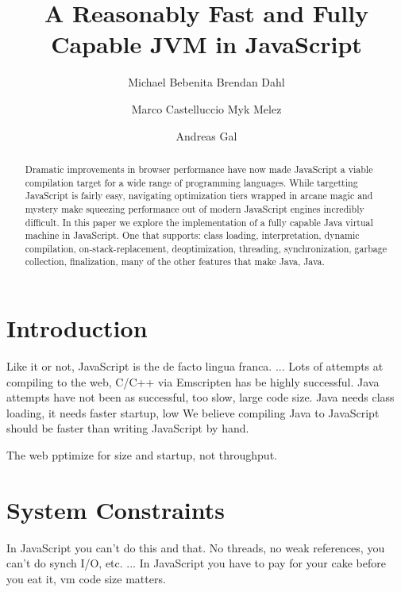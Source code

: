 \documentclass{acm_proc_article-sp}
\begin{document}
\title{A Reasonably Fast and Fully Capable JVM in JavaScript}

\author{
\alignauthor Michael Bebenita
\alignauthor Brendan Dahl
\and
\alignauthor Marco Castelluccio
\alignauthor Myk Melez
\and
\alignauthor Andreas Gal
}

\maketitle
\begin{abstract}
Dramatic improvements in browser performance have now made JavaScript a viable compilation target for a wide range of programming languages.
While targetting JavaScript is fairly easy, navigating optimization tiers wrapped in arcane magic and mystery make squeezing performance out of modern JavaScript engines incredibly difficult.
In this paper we explore the implementation of a fully capable Java virtual machine in JavaScript.
One that supports: class loading, interpretation, dynamic compilation, on-stack-replacement, deoptimization, threading, synchronization, garbage collection, finalization, many of the other features that make Java, Java.
\end{abstract}




\section{Introduction}

Like it or not, JavaScript is the de facto lingua franca. ...
Lots of attempts at compiling to the web, C/C++ via Emscripten has be highly successful.
Java attempts have not been as successful, too slow, large code size.
Java needs class loading, it needs faster startup, low 
We believe compiling Java to JavaScript should be faster than writing JavaScript by hand.

The web pptimize for size and startup, not throughput.

\section{System Constraints}

In JavaScript you can't do this and that. No threads, no weak references, you can't do synch I/O, etc. ...
In JavaScript you have to pay for your cake before you eat it, vm code size matters.
\end{document}
